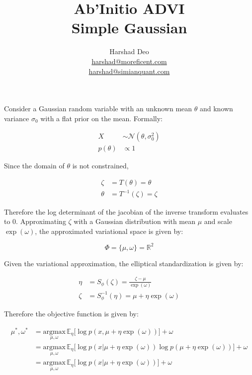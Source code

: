 \documentclass[10pt]{article}
\title{Ab'Initio ADVI \\ Simple Gaussian}
\author{Harshad Deo \\ 
  \href{mailto:harshad@moreficent.com}{harshad@moreficent.com} \\ 
  \href{mailto:harshad@simianquant.com}{harshad@simianquant.com}
}
\date{}
\begin{document}
  
\maketitle

Consider a Gaussian random variable with an unknown mean $\theta$ and known variance $\sigma_0$ with a flat prior on
the mean. Formally:

\begin{align*}
  X &\sim \mathcal{N}(\theta, \sigma_0^2)\\
  p(\theta) &\varpropto 1
\end{align*}

Since the domain of $\theta$ is not constrained, 

\begin{align*}
  \zeta &= T(\theta) = \theta \\
  \theta &= T^{-1}(\zeta) = \zeta
\end{align*}

Therefore the log determinant of the jacobian of the inverse transform evaluates to 0. Approximating $\zeta$ with a 
Gaussian distribution with mean $\mu$ and scale $\exp(\omega)$, the approximated variational space is given by:

\begin{equation*}
  \Phi = \{\mu, \omega\} = \mathbb{R}^2
\end{equation*}

Given the variational approximation, the elliptical standardization is given by:

\begin{align*}
  \eta &= S_{\phi}(\zeta) = \frac{\zeta - \mu}{\exp(\omega)} \\
  \zeta &= S_{\phi}^{-1}(\eta) = \mu + \eta \exp(\omega)
\end{align*}

Therefore the objective function is given by:

\begin{align*}
  \mu^*, \omega^* &= \underset{\mu, \omega}{\text{argmax}}\,\mathbb{E}_\eta\big[\log p(x, \mu + \eta\exp(\omega)) \big] + \omega \\
  &= \underset{\mu, \omega}{\text{argmax}}\,\mathbb{E}_\eta\big[\log p(x | \mu + \eta\exp(\omega)) \log p(\mu + \eta \exp(\omega))] + \omega \\
  &= \underset{\mu, \omega}{\text{argmax}}\,\mathbb{E}_\eta\big[\log p(x | \mu + \eta\exp(\omega))] + \omega
\end{align*}
\end{document}
